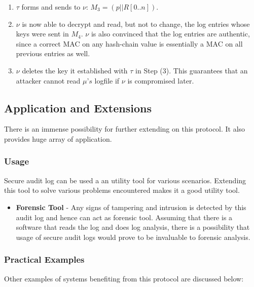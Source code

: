 \documentclass[12pt, letter]{article}
\begin{document}
\begin{enumerate}
    \item $\tau$ forms and sends to $\nu$: $M_3 = (p|| R[0..n])$.
    
    \item $\nu$ is now able to decrypt and read, but not to change, the log entries whose keys were sent in $M_4$. $\nu$ is also convinced that the log entries are authentic, since a correct MAC on any hash-chain value is essentially a MAC on all previous entries as well.
    
    \item $\nu$ deletes the key it established with $\tau$ in Step (3). This guarantees that an attacker cannot read $\mu’s$ logfile if $\nu$ is compromised later. 

\end{enumerate}



\subsection{Application and Extensions}
\label{sec:application}

There is an immense possibility for further extending on this protocol. It also provides huge array of application.

\subsubsection{Usage}

Secure audit log can be used a an utility tool for various scenarios. Extending this tool to solve various problems encountered makes it a good utility tool.

\begin{itemize}
    \item \textbf{Forensic Tool} - Any signs of tampering and intrusion is detected by this audit log and hence can act as forensic tool. Assuming that there is a software that reads the log and does log analysis, there is a possibility that usage of secure audit logs would prove to be invaluable to forensic analysis.
\end{itemize}

\subsubsection{Practical Examples}

Other examples of systems benefiting from this protocol are discussed below:\\
\end{document}
